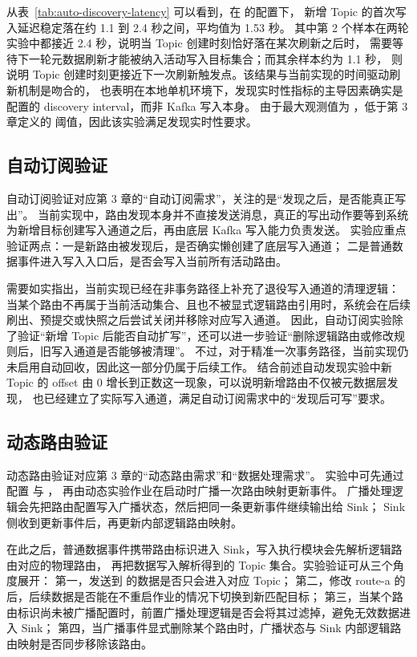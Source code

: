 从表~\ref{tab:auto-discovery-latency} 可以看到，在  的配置下，
新增 Topic 的首次写入延迟稳定落在约 1.1 到 2.4 秒之间，平均值为 1.53 秒。
其中第 2 个样本在两轮实验中都接近 2.4 秒，说明当 Topic 创建时刻恰好落在某次刷新之后时，
需要等待下一轮元数据刷新才能被纳入活动写入目标集合；而其余样本约为 1.1 秒，
则说明 Topic 创建时刻更接近下一次刷新触发点。该结果与当前实现的时间驱动刷新机制是吻合的，
也表明在本地单机环境下，发现实时性指标的主导因素确实是配置的 discovery interval，而非 Kafka 写入本身。
由于最大观测值为 ，低于第 3 章定义的  阈值，因此该实验满足发现实时性要求。

\subsection{自动订阅验证}

自动订阅验证对应第 3 章的“自动订阅需求”，关注的是“发现之后，是否能真正写出”。
当前实现中，路由发现本身并不直接发送消息，真正的写出动作要等到系统为新增目标创建写入通道之后，再由底层 Kafka 写入能力负责发送。
实验应重点验证两点：一是新路由被发现后，是否确实懒创建了底层写入通道；
二是普通数据事件进入写入入口后，是否会写入当前所有活动路由。

需要如实指出，当前实现已经在非事务路径上补充了退役写入通道的清理逻辑：
当某个路由不再属于当前活动集合、且也不被显式逻辑路由引用时，系统会在后续刷出、预提交或快照之后尝试关闭并移除对应写入通道。
因此，自动订阅实验除了验证“新增 Topic 后能否自动扩写”，还可以进一步验证“删除逻辑路由或修改规则后，旧写入通道是否能够被清理”。
不过，对于精准一次事务路径，当前实现仍未启用自动回收，因此这一部分仍属于后续工作。
结合前述自动发现实验中新 Topic 的 offset 由 0 增长到正数这一现象，可以说明新增路由不仅被元数据层发现，
也已经建立了实际写入通道，满足自动订阅需求中的“发现后可写”要求。

\subsection{动态路由验证}

动态路由验证对应第 3 章的“动态路由需求”和“数据处理需求”。
实验中可先通过  配置  与 ，
再由动态实验作业在启动时广播一次路由映射更新事件。
广播处理逻辑会先把路由配置写入广播状态，然后把同一条更新事件继续输出给 Sink；
Sink 侧收到更新事件后，再更新内部逻辑路由映射。

在此之后，普通数据事件携带路由标识进入 Sink，写入执行模块会先解析逻辑路由对应的物理路由，
再把数据写入解析得到的 Topic 集合。实验验证可从三个角度展开：
第一，发送到  的数据是否只会进入对应 Topic；
第二，修改 route-a 的  后，后续数据是否能在不重启作业的情况下切换到新匹配目标；
第三，当某个路由标识尚未被广播配置时，前置广播处理逻辑是否会将其过滤掉，避免无效数据进入 Sink；
第四，当广播事件显式删除某个路由时，广播状态与 Sink 内部逻辑路由映射是否同步移除该路由。

